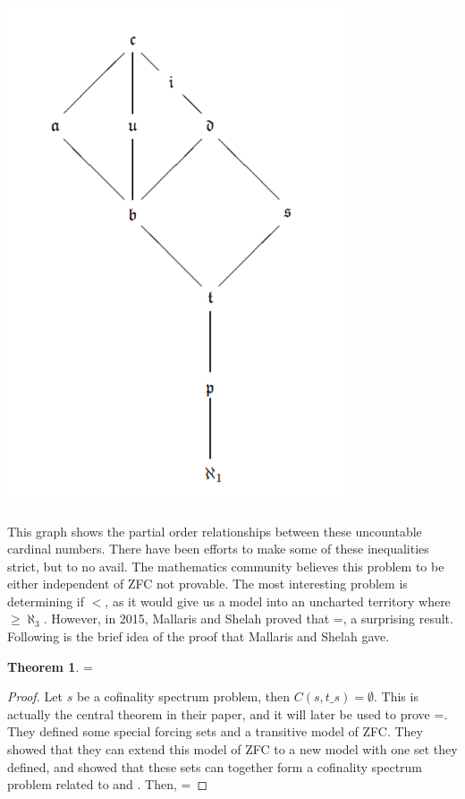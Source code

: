 \documentclass[12pt]{article}
\theoremstyle{definition}
\newtheorem{theorem}{Theorem}[section]
\begin{document}
\begin{center}
    \includegraphics[width=10cm, height=15cm]{diagram}
\end{center}
This graph shows the partial order relationships between these uncountable cardinal numbers. There have been efforts to make some of these inequalities strict, but to no avail. The mathematics community believes this problem to be either independent of ZFC not provable. The most interesting problem is determining if $<$, as it would give us a model into an uncharted territory where $\geq\aleph_3$. However, in 2015, Mallaris and Shelah proved that =, a surprising result. Following is the brief idea of the proof that Mallaris and Shelah gave.
\begin{theorem}
    =
\end{theorem}
\begin{proof}
    Let $s$ be a cofinality spectrum problem, then $C(s,t\_s)=\emptyset$. This is actually the central theorem in their paper, and it will later be used to prove =. They defined some special forcing sets and a transitive model of ZFC. They showed that they can extend this model of ZFC to a new model with one set they defined, and showed that these sets can together form a cofinality spectrum problem related to  and . Then, =
\end{proof}
\end{document}
